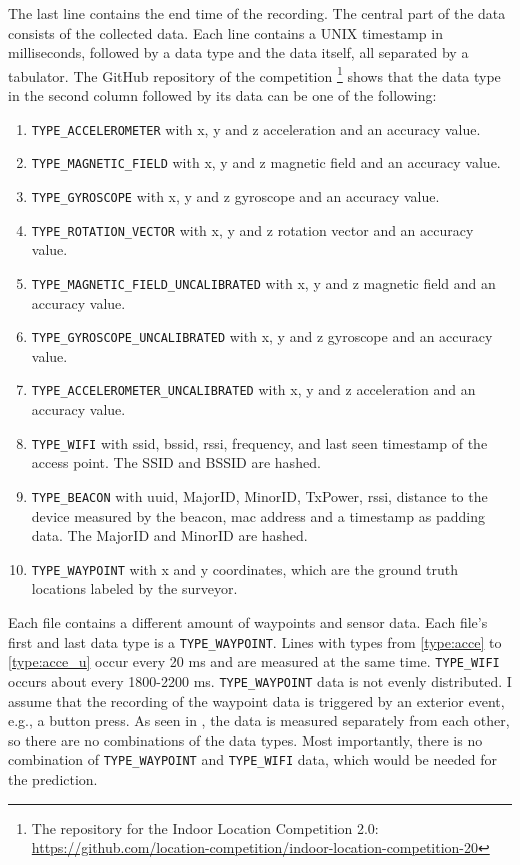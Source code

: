 The last line contains the end time of the recording.
The central part of the data consists of the collected data. 
Each line contains a UNIX timestamp in milliseconds, followed by a data type and the data itself, all separated by a tabulator.
The GitHub repository of the competition \footnote{The repository for the Indoor Location Competition 2.0: \url{https://github.com/location-competition/indoor-location-competition-20}} shows that the data type in the second column followed by its data can be one of the following:

\begin{enumerate}
    \item\label{type:acce} \texttt{TYPE\_ACCELEROMETER} with x, y and z acceleration and an accuracy value.
    \item\label{type:mag}  \texttt{TYPE\_MAGNETIC\_FIELD} with x, y and z magnetic field and an accuracy value.
    \item\label{type:gyro}  \texttt{TYPE\_GYROSCOPE} with x, y and z gyroscope and an accuracy value.
    \item\label{type:rot}  \texttt{TYPE\_ROTATION\_VECTOR} with x, y and z rotation vector and an accuracy value.
    \item\label{type:mag_u}  \texttt{TYPE\_MAGNETIC\_FIELD\_UNCALIBRATED} with x, y and z magnetic field and an accuracy value.
    \item\label{type:gyro_u}  \texttt{TYPE\_GYROSCOPE\_UNCALIBRATED} with x, y and z gyroscope and an accuracy value.
    \item\label{type:acce_u}  \texttt{TYPE\_ACCELEROMETER\_UNCALIBRATED} with x, y and z acceleration and an accuracy value.
    \item\label{type:wifi}  \texttt{TYPE\_WIFI} with \ac{ssid}, \ac{bssid}, \ac{rssi}, frequency, and last seen timestamp of the access point. The SSID and BSSID are hashed.
    \item\label{type:beacon}  \texttt{TYPE\_BEACON} with \ac{uuid}, \ac{MajorID}, \ac{MinorID}, \ac{TxPower}, \ac{rssi}, distance to the device measured by the beacon, \ac{mac} address and a timestamp as padding data. The MajorID and MinorID are hashed.
    \item\label{type:way}  \texttt{TYPE\_WAYPOINT} with x and y coordinates, which are the ground truth locations labeled by the surveyor.
\end{enumerate}

Each file contains a different amount of waypoints and sensor data.
Each file's first and last data type is a \texttt{TYPE\_WAYPOINT}.
Lines with types from \ref{type:acce} to \ref{type:acce_u} occur every 20 ms and are measured at the same time.
\texttt{TYPE\_WIFI} occurs about every 1800-2200 ms.
\texttt{TYPE\_WAYPOINT} data is not evenly distributed.
I assume that the recording of the waypoint data is triggered by an exterior event, e.g., a button press. 
As seen in , the data is measured separately from each other, so there are no combinations of the data types.
Most importantly, there is no combination of \texttt{TYPE\_WAYPOINT} and \texttt{TYPE\_WIFI} data, which would be needed for the prediction.

